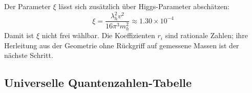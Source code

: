 	\begin{important}
		Der Parameter $\xi$ lässt sich zusätzlich über Higgs-Parameter abschätzen:
		\begin{equation}
			\xi = \frac{\lambda_h^2 v^2}{16\pi^3 m_h^2} \approx 1.30 \times 10^{-4}
		\end{equation}
		Damit ist $\xi$ nicht frei wählbar. Die Koeffizienten $r_i$ sind rationale Zahlen; ihre Herleitung aus der Geometrie ohne Rückgriff auf gemessene Massen ist der nächste Schritt.
	\end{important}
	
	\subsection{Universelle Quantenzahlen-Tabelle}
	\label{subsec:universal_quantum_table}
	
	\begin{table}[H]
		\centering
		\caption{Vollständige universelle Quantenzahlen-Tabelle für alle Fermionen}
		\label{tab:universal_quantum_numbers}
	\end{table}
	
